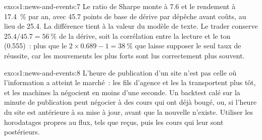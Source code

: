 \begin{solution}{exo:s1:news-and-events:7}
Le ratio de Sharpe monte à 7.6 et le rendement à 17.4~\% par an, avec 45.7 points de base de dérive par dépêche avant coûts, au lieu de 25.4. La différence tient à la
valeur du modèle de texte. Le trader conserve $25.4/45.7 = 56~\%$ de la dérive, soit la corrélation entre la lecture et le ton (0.555)~: plus que le
$2 \times 0.689 - 1 = 38~\%$ que laisse supposer le seul taux de réussite, car les mouvements les plus forts sont lus correctement plus souvent.
\end{solution}

\begin{solution}{exo:s1:news-and-events:8}
L'heure de publication d'un site n'est pas celle où l'information a atteint le marché~: les fils d'agence et les  la transportent plus tôt, et les machines la négocient
en moins d'une seconde. Un backtest calé sur la minute de publication peut négocier à des cours qui ont déjà bougé, ou, si l'heure du site est antérieure à sa mise à jour, avant que la
nouvelle n'existe. Utiliser les horodatages propres au flux, tels que reçus, puis les cours qui leur sont postérieurs.
\end{solution}

